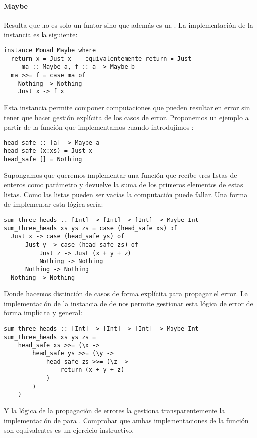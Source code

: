 \paragraph{Maybe}
Resulta que  no es solo un funtor sino que además
es un . La implementación de la instancia es la siguiente:
\begin{verbatim}
instance Monad Maybe where
  return x = Just x -- equivalentemente return = Just
  -- ma :: Maybe a, f :: a -> Maybe b
  ma >>= f = case ma of
    Nothing -> Nothing
    Just x -> f x
\end{verbatim}
Esta instancia permite componer computaciones que pueden resultar
en error sin tener que hacer gestión explícita de los casos de error.
Proponemos un ejemplo a partir de la función
 que implementamos cuando introdujimos
:
\begin{verbatim}
head_safe :: [a] -> Maybe a
head_safe (x:xs) = Just x
head_safe [] = Nothing
\end{verbatim}
Supongamos que queremos implementar una función que recibe tres listas
de enteros como parámetro y devuelve la suma de los primeros elementos
de estas listas. Como las listas pueden ser vacías la computación
puede fallar. Una forma de implementar esta lógica sería:
\begin{verbatim}
sum_three_heads :: [Int] -> [Int] -> [Int] -> Maybe Int
sum_three_heads xs ys zs = case (head_safe xs) of
  Just x -> case (head_safe ys) of
      Just y -> case (head_safe zs) of
          Just z -> Just (x + y + z)
          Nothing -> Nothing
      Nothing -> Nothing
  Nothing -> Nothing
\end{verbatim}
Donde hacemos distinción de casos de forma explícita para propagar
el error.
La implementación de la instancia de  de  nos
permite gestionar esta lógica de error de forma implícita y general:
\begin{verbatim}
sum_three_heads :: [Int] -> [Int] -> [Int] -> Maybe Int
sum_three_heads xs ys zs =
    head_safe xs >>= (\x ->
        head_safe ys >>= (\y ->
            head_safe zs >>= (\z ->
                return (x + y + z)
            )
        )
    )
\end{verbatim}
Y la lógica de la propagación de errores la gestiona transparentemente
la implementación de \cod{>{}>=} para .
Comprobar que ambas implementaciones de la función
 son equivalentes es un ejercicio instructivo.


